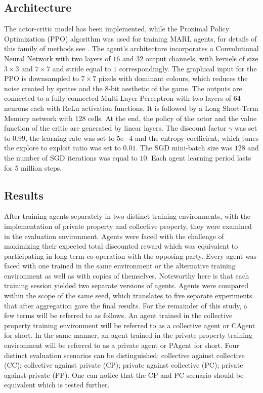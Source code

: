 \documentclass[pdflatex,sn-basic,lineno]{sn-jnl}
\theoremstyle{thmstyleone}%
\theoremstyle{thmstyletwo}%
\theoremstyle{thmstylethree}%
\begin{document}
\subsection{Architecture}\label{subsec4-2}
The actor-critic model has been implemented, while the Proximal Policy Optimization (PPO) algorithm was used for
training MARL agents, for details of this family of methods see \cite{Schulman2017}. The agent's architecture
incorporates a Convolutional Neural Network with two layers of $16$ and $32$ output channels, with kernels of size
$3\times3$ and $7\times7$ and stride equal to $1$ correspondingly. The graphical input for the PPO is downsampled to
$7\times7$ pixels with dominant colours, which reduces the noise created by sprites and the $8$-bit aesthetic of the
game. The outputs are connected to a fully connected Multi-Layer Perceptron with two layers of $64$ neurons each with
ReLu activation functions. It is followed by a Long Short-Term Memory network with 128 cells. At the end, the policy of
the actor and the value function of the critic are generated by linear layers. The discount factor $\gamma$ was set to
$0.99$, the learning rate was set to $5\mathrm{e}{-4}$ and the entropy coefficient, which tunes the explore to exploit
ratio was set to $0.01$. The SGD mini-batch size was $128$ and the number of SGD iterations was equal to $10$. Each
agent learning period lasts for 5 million steps.

\subsection{Results}\label{subsec4-3}

After training agents separately in two distinct training environments, with the implementation of private property and
collective property, they were examined in the evaluation environment. Agents were faced with the challenge of
maximizing their expected total discounted reward which was equivalent to participating in long-term co-operation with
the opposing party. Every agent was faced with one trained in the same environment or the alternative training
environment as well as with copies of themselves. Noteworthy here is that each training session yielded two separate
versions of agents. Agents were compared within the scope of the same seed, which translates to five separate
experiments that after aggregation gave the final results. For the remainder of this study, a few terms will be referred
to as follows. An agent trained in the collective property training environment will be referred to as a collective 
agent or CAgent for short. In the same manner, an agent trained in the private property training environment will be
referred to as a
private agent or PAgent for short. Four distinct evaluation scenarios can be distinguished: collective against
collective (CC); collective against private
(CP); private against collective (PC); private against private (PP). One can notice that the CP and PC scenario should
be equivalent which is tested further.
\end{document}
